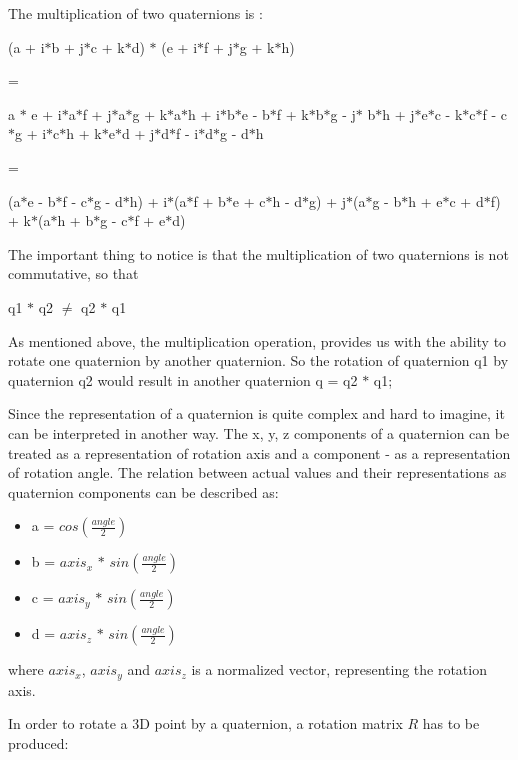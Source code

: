 \documentclass[times, 10pt,twocolumn]{article}
\begin{document}
The multiplication of two quaternions is :

\begin{center}
(a + i$\ast$b + j$\ast$c + k$\ast$d) $\ast$ (e + i$\ast$f + j$\ast$g + k$\ast$h)

=

a $\ast$ e + i$\ast$a$\ast$f  + j$\ast$a$\ast$g + k$\ast$a$\ast$h + i$\ast$b$\ast$e - b$\ast$f  + k$\ast$b$\ast$g - j$\ast$ b$\ast$h + j$\ast$e$\ast$c - k$\ast$c$\ast$f - c$\ast$g + i$\ast$c$\ast$h + k$\ast$e$\ast$d + j$\ast$d$\ast$f - i$\ast$d$\ast$g - d$\ast$h

=

(a$\ast$e - b$\ast$f - c$\ast$g - d$\ast$h)  + i$\ast$(a$\ast$f + b$\ast$e + c$\ast$h - d$\ast$g) + j$\ast$(a$\ast$g - b$\ast$h + e$\ast$c + d$\ast$f) + k$\ast$(a$\ast$h + b$\ast$g - c$\ast$f + e$\ast$d)
\end{center}

The important thing to notice is that the multiplication of two quaternions is not commutative, so that
\begin{center}
q1 $\ast$ q2 $\neq$ q2 $\ast$ q1
\end{center}

As mentioned above, the multiplication operation,  provides us with the ability to rotate one quaternion by another quaternion. So the rotation of quaternion q1 by quaternion q2 would result in another quaternion q = q2 $\ast$ q1;

Since the representation of a quaternion is quite complex and hard to imagine, it can be interpreted in another way. The x, y, z components of a quaternion can be treated as a representation of rotation axis and a component - as a representation of rotation angle. The relation between actual values and their representations as quaternion components can be described as:

\begin{itemize}
\item a = $cos(\frac{angle}{2})$
\item b =  $axis_x$ $\ast$ $sin(\frac{angle}{2})$
\item c = $axis_y$ $\ast$ $sin(\frac{angle}{2})$
\item d = $axis_z$ $\ast$ $sin(\frac{angle}{2})$
\end{itemize}
where $axis_x$, $axis_y$ and $axis_z$ is a normalized vector, representing the rotation axis.

In order to rotate a 3D point by a quaternion, a rotation matrix $R$ has to be produced:
\end{document}
